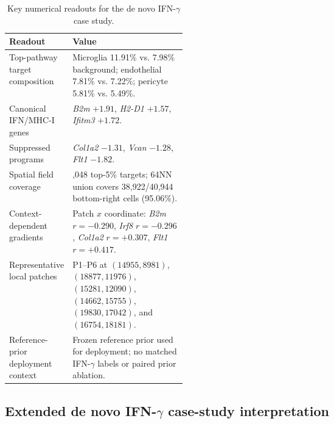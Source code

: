 \documentclass[sigconf,review,balance=false]{acmart}
\begin{document}
\begin{table}[t]
\centering
\caption{Key numerical readouts for the de novo IFN-$\gamma$ case study.}
\label{tab:app_ifng_case_readouts}
\footnotesize
\setlength{\tabcolsep}{4pt}
\renewcommand{\arraystretch}{1.12}
\begin{tabularx}{\linewidth}{@{}>{\raggedright\arraybackslash}p{0.34\linewidth}>{\raggedright\arraybackslash}X@{}}
\toprule
Readout & Value \\
\midrule
Top-pathway target composition &
Microglia 11.91\% vs. 7.98\% background; endothelial 7.81\% vs. 7.22\%; pericyte 5.81\% vs. 5.49\%. \\

Canonical IFN/MHC-I genes &
\textit{B2m} $+1.91$, \textit{H2-D1} $+1.57$, \textit{Ifitm3} $+1.72$. \\

Suppressed programs &
\textit{Col1a2} $-1.31$, \textit{Vcan} $-1.28$, \textit{Flt1} $-1.82$. \\

Spatial field coverage &
2,048 top-5\% targets; 64NN union covers 38,922/40,944 bottom-right cells (95.06\%). \\

Context-dependent gradients &
Patch $x$ coordinate: \textit{B2m} $r=-0.290$, \textit{Irf8} $r=-0.296$, \textit{Col1a2} $r=+0.307$, \textit{Flt1} $r=+0.417$. \\

Representative local patches &
P1--P6 at $(14955,8981)$, $(18877,11976)$, $(15281,12090)$, $(14662,15755)$, $(19830,17042)$, and $(16754,18181)$. \\

Reference-prior deployment context &
Frozen reference prior used for deployment; no matched IFN-$\gamma$ labels or paired prior ablation. \\
\bottomrule
\end{tabularx}
\end{table}






\subsection{Extended de novo IFN-\texorpdfstring{$\gamma$}{gamma} case-study interpretation}
\label{app:ifng_extended_interpretation}
\end{document}
